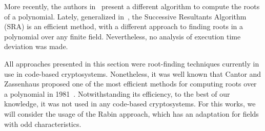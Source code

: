 More recently, the authors in~\cite{petit2014finding} present a different algorithm to compute the roots of a polynomial. Lately, generalized in~\cite{petit2016finding}, the Successive Resultants Algorithm (SRA) is an efficient method, with a different approach to finding roots in a polynomial over any finite field. Nevertheless, no analysis of execution time deviation was made.

All approaches presented in this section were root-finding techniques currently in use in code-based cryptosystems. Nonetheless, it was well known that Cantor and Zassenhaus proposed one of the most efficient methods for computing roots over a polynomial in 1981~\cite{cantor1981new}. Notwithstanding its efficiency, to the best of our knowledge, it was not used in any code-based cryptosystems. For this works, we will consider the usage of the Rabin approach, which has an adaptation for fields with odd characteristics.